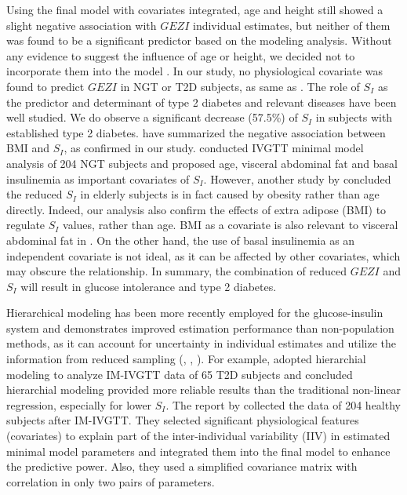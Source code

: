 \documentclass[utf8]{frontiersSCNS} %
\begin{document}
Using the final model with covariates integrated, age and height still showed a slight negative association with $GEZI$ individual estimates, but neither of them was found to be a significant predictor based on the modeling analysis. Without any evidence to suggest the influence of age or height, we decided not to incorporate them into the model \citep{Denti2010}. In our study, no physiological covariate was found to predict $GEZI$ in NGT or T2D subjects, as same as \citet{Denti2010}.  
The role of $S_I$ as the predictor and determinant of type 2 diabetes and relevant diseases have been well studied. We do observe a significant decrease (57.5\%) of $S_I$ in subjects with established type 2 diabetes.  \citet{Bergman1997TheTolerance} have summarized the negative association between BMI and $S_I$, as confirmed in our study. \citet{Denti2010} conducted IVGTT minimal model analysis of 204 NGT subjects and proposed age, visceral abdominal fat and basal insulinemia as important covariates of $S_I$. However, another study by \citet{helen_2010_age} concluded the reduced $S_I$ in elderly subjects is in fact caused by obesity rather than age directly. Indeed, our analysis also confirm the effects of extra adipose (BMI) to regulate $S_I$ values, rather than age. BMI as a covariate is also relevant to visceral abdominal fat in \citet{Denti2010}. On the other hand, the use of basal insulinemia as an independent covariate is not ideal, as it can be affected by other covariates, which may obscure the relationship. In summary, the combination of reduced $GEZI$ and $S_I$ will result in glucose intolerance and type 2 diabetes. 

Hierarchical modeling has been more recently employed for the glucose-insulin system and demonstrates improved estimation performance than non-population methods, as it can account for uncertainty in individual estimates and utilize the information from reduced sampling (\citet{agbaje_2003}, \citet{Denti2009}, \citet{Denti2010}). For example, \citet{agbaje_2003} adopted hierarchial modeling to analyze IM-IVGTT data of 65 T2D subjects and concluded hierarchial modeling provided more reliable results than the traditional non-linear regression, especially for lower $S_I$. The report by \citet{Denti2010} collected the data of 204 healthy subjects after IM-IVGTT. %
They selected significant physiological features (covariates) to explain part of the inter-individual variability (IIV) in estimated minimal model parameters and integrated them into the final model to enhance the predictive power. Also, they used a simplified covariance matrix with correlation in only two pairs of parameters. %
\end{document}
